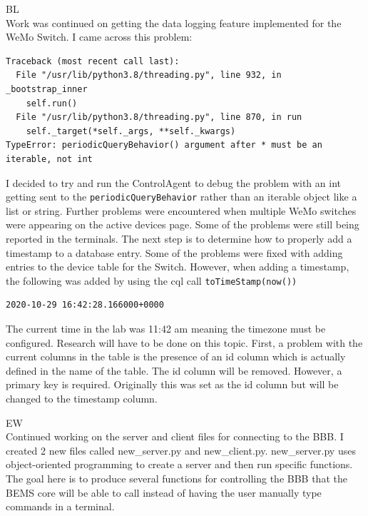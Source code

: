 \documentclass[fontsize=11pt, %
                             paper=letter, %
                             openany, %
                             captions=tableheading,
                             index=totoc,
                             hyperref]{labbook}
\begin{document}
BL\\
Work was continued on getting the data logging feature implemented for the WeMo Switch. I came across this problem:
\begin{Verbatim}
Traceback (most recent call last):
  File "/usr/lib/python3.8/threading.py", line 932, in _bootstrap_inner
    self.run()
  File "/usr/lib/python3.8/threading.py", line 870, in run
    self._target(*self._args, **self._kwargs)
TypeError: periodicQueryBehavior() argument after * must be an iterable, not int
\end{Verbatim}
I decided to try and run the ControlAgent to debug the problem with an int getting sent to the \texttt{periodicQueryBehavior} rather than an iterable object like a list or string.
\medbreak\noindent
Further problems were encountered when multiple WeMo switches were appearing on the active devices page. Some of the problems were still being reported in the terminals. The next step is to determine how to properly add a timestamp to a database entry. Some of the problems were fixed with adding entries to the device table for the Switch. However, when adding a timestamp, the following was added by using the cql call \texttt{toTimeStamp(now())}
\begin{Verbatim}
2020-10-29 16:42:28.166000+0000
\end{Verbatim}
The current time in the lab was 11:42 am meaning the timezone must be configured. Research will have to be done on this topic. First, a problem with the current columns in the table is the presence of an id column which is actually defined in the name of the table. The id column will be removed. However, a primary key is required. Originally this was set as the id column but will be changed to the timestamp column.

EW\\
Continued working on the server and client files for connecting to the BBB. I created 2 new files called new\_server.py and new\_client.py. new\_server.py uses object-oriented programming to create a server and then run specific functions. The goal here is to produce several functions for controlling the BBB that the BEMS core will be able to call instead of having the user manually type commands in a terminal.
\end{document}
